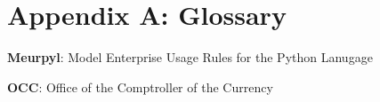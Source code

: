 \newcommand{\definition}[2]{
	\textbf{#1}: #2
}

\section{Appendix A: Glossary}

\thispagestyle{section_start_style}

\vspace*{.3cm}

\setlength{\parskip}{0em}

	\definition{Meurpyl}{Model Enterprise Usage Rules for the Python Lanugage}

	\definition{OCC}{Office of the Comptroller of the Currency}

\setlength{\parskip}{1em}